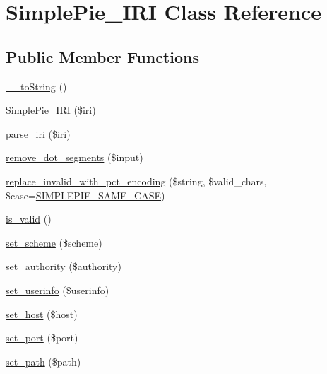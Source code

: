\hypertarget{class_simple_pie___i_r_i}{\section{Simple\-Pie\-\_\-\-I\-R\-I Class Reference}
\label{class_simple_pie___i_r_i}
}
\subsection*{Public Member Functions}
\begin{DoxyCompactItemize}
\item 
\hyperlink{class_simple_pie___i_r_i_a8ae703e9c563366e32105859469ff1fb}{\-\_\-\-\_\-to\-String} ()
\item 
\hyperlink{class_simple_pie___i_r_i_abb455ccb54944f15061148174efe987c}{Simple\-Pie\-\_\-\-I\-R\-I} (\$iri)
\item 
\hyperlink{class_simple_pie___i_r_i_af60c5ecb27121bf2900625569e2f3868}{parse\-\_\-iri} (\$iri)
\item 
\hyperlink{class_simple_pie___i_r_i_ada5ec36216d7aa5fa6bda80da2b4a626}{remove\-\_\-dot\-\_\-segments} (\$input)
\item 
\hyperlink{class_simple_pie___i_r_i_aecb533e9a023b18f6381c07b1ba67b73}{replace\-\_\-invalid\-\_\-with\-\_\-pct\-\_\-encoding} (\$string, \$valid\-\_\-chars, \$case=\hyperlink{simplepie_8inc_ad80a8b322741dea8352381f19b50cb59}{S\-I\-M\-P\-L\-E\-P\-I\-E\-\_\-\-S\-A\-M\-E\-\_\-\-C\-A\-S\-E})
\item 
\hyperlink{class_simple_pie___i_r_i_a2ae293406978f01f86a12726e738c91e}{is\-\_\-valid} ()
\item 
\hyperlink{class_simple_pie___i_r_i_a9ba58042a5c8330508ff0770428dd5d8}{set\-\_\-scheme} (\$scheme)
\item 
\hyperlink{class_simple_pie___i_r_i_a572389a6842a64f61f40e440fead1bc1}{set\-\_\-authority} (\$authority)
\item 
\hyperlink{class_simple_pie___i_r_i_a394c19604ffc000e19b970723cbf22a3}{set\-\_\-userinfo} (\$userinfo)
\item 
\hyperlink{class_simple_pie___i_r_i_a80c3833633365bbf4e9fb33304c0cf0b}{set\-\_\-host} (\$host)
\item 
\hyperlink{class_simple_pie___i_r_i_a49e4219357dd31d87c7286eea46ac92c}{set\-\_\-port} (\$port)
\item 
\hyperlink{class_simple_pie___i_r_i_a480c4cb1c39fdb87b7dc56e0f7e86b70}{set\-\_\-path} (\$path)
\item 

\end{DoxyCompactItemize}
